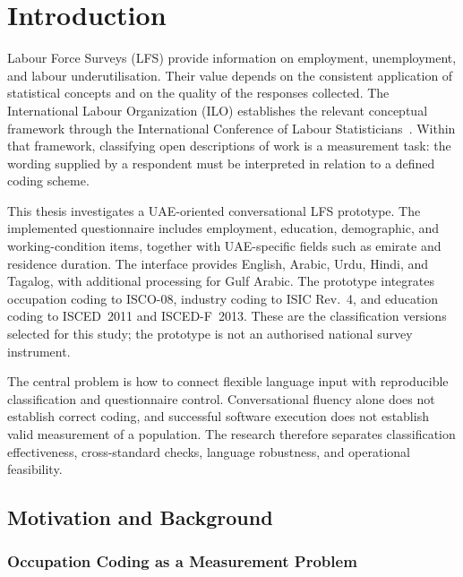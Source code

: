 \chapter{Introduction}
\label{chap:intro}

Labour Force Surveys (LFS) provide information on employment,
unemployment, and labour underutilisation. Their value depends on the
consistent application of statistical concepts and on the quality of the
responses collected. The International Labour Organization (ILO)
establishes the relevant conceptual framework through the International
Conference of Labour Statisticians~\cite{ilo2013workstats}. Within that
framework, classifying open descriptions of work is a measurement task:
the wording supplied by a respondent must be interpreted in relation to a
defined coding scheme.

This thesis investigates a UAE-oriented conversational LFS prototype.
The implemented questionnaire includes employment, education, demographic,
and working-condition items, together with UAE-specific fields such as
emirate and residence duration. The interface provides English, Arabic,
Urdu, Hindi, and Tagalog, with additional processing for Gulf Arabic.
The prototype integrates occupation coding to ISCO-08, industry coding to
ISIC Rev.~4, and education coding to ISCED~2011 and ISCED-F~2013. These
are the classification versions selected for this study; the prototype is
not an authorised national survey instrument.

The central problem is how to connect flexible language input with
reproducible classification and questionnaire control. Conversational
fluency alone does not establish correct coding, and successful software
execution does not establish valid measurement of a population. The
research therefore separates classification effectiveness, cross-standard
checks, language robustness, and operational feasibility.

\section{Motivation and Background}
\label{sec:motivation}

\subsection{Occupation Coding as a Measurement Problem}

